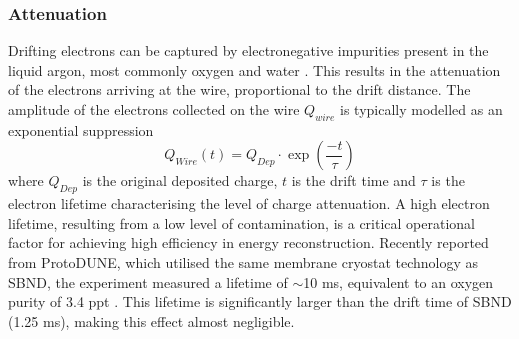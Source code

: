 \subsubsection{Attenuation}
Drifting electrons can be captured by electronegative impurities present in the liquid argon, most commonly oxygen and water \cite{protodune}.
This results in the attenuation of the electrons arriving at the wire, proportional to the drift distance. 
The amplitude of the electrons collected on the wire $Q_{wire}$ is typically modelled as an exponential suppression
\begin{equation}
	Q_{Wire} (t) = Q_{Dep} \cdot \exp\left(\frac{-t}{\tau}\right)
\label{eq:etime}
\end{equation}
where $Q_{Dep}$ is the original deposited charge, $t$ is the drift time and $\tau$ is the electron lifetime characterising the level of charge attenuation.
A high electron lifetime, resulting from a low level of contamination, is a critical operational factor for achieving high efficiency in energy reconstruction.
Recently reported from ProtoDUNE, which utilised the same membrane cryostat technology as SBND, the experiment measured a lifetime of $\sim$10 ms, equivalent to an oxygen purity of 3.4 ppt \cite{protodune}.
This lifetime is significantly larger than the drift time of SBND (1.25 ms), making this effect almost negligible. 



